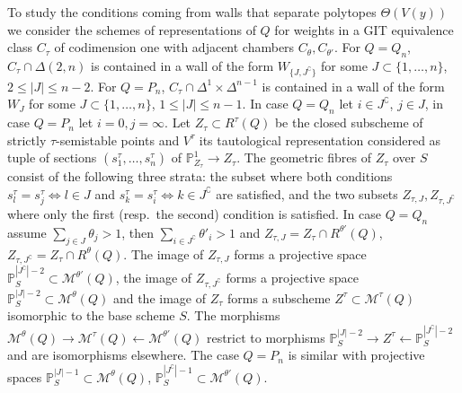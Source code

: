 \documentclass[ALCO,ThmDefs,Unicode,epreuves]{cedram}
\def\P{\mathds P}
\begin{document}
To study the conditions coming from walls that separate polytopes $\Theta(V(y))$ 
we consider the schemes of representations of $Q$ for weights in a GIT equivalence
class $C_\tau$ of codimension one with adjacent chambers $C_\theta,C_{\theta'}$. 
For $Q=Q_n$, $C_\tau\cap\Delta(2,n)$ is contained in a wall of the form 
$W_{\{J,J^\complement\}}$ for some $J\subset\{1,\ldots,n\}$, $2\leq|J|\leq n-2$. 
For $Q=P_n$, $C_\tau\cap\Delta^1\times\Delta^{n-1}$ is contained in a 
wall of the form $W_J$ for some $J\subset\{1,\ldots,n\}$, $1\leq|J|\leq n-1$. 
In case $Q=Q_n$ let $i\in J^\complement$, $j\in J$, in case $Q=P_n$ let $i=0,j=\infty$.
Let $Z_\tau\subset R^\tau(Q)$ be the closed subscheme of strictly 
$\tau$-semistable points and $V^\tau$ its tautological representation
considered as tuple of sections $(s^\tau_1,\ldots,s^\tau_n)$ of $\P^1_{Z_\tau}\to Z_\tau$.
The geometric fibres of $Z_\tau$ over $S$ consist of the following three strata: 
the subset where both conditions $s^\tau_l=s^\tau_j\Leftrightarrow l\in J$ and 
$s^\tau_k=s^\tau_i\Leftrightarrow k\in J^\complement$ 
are satisfied, and the two subsets $Z_{\tau,J},Z_{\tau,J^\complement}$ where only 
the first (resp.\ the second) condition is satisfied. 
In case $Q=Q_n$ assume $\sum_{j\in J}\theta_j>1$, then 
$\sum_{i\in J^\complement}\theta'_i>1$ and $Z_{\tau,J}=Z_{\tau}\cap R^{\theta'}(Q)$, 
$Z_{\tau,J^\complement}=Z_{\tau}\cap R^\theta(Q)$.
The image of $Z_{\tau,J}$ forms a projective space 
$\P^{|J^\complement|-2}_S\subset\mathcal M^{\theta'}(Q)$, the image of 
$Z_{\tau,J^\complement}$ forms a projective space 
$\P^{|J|-2}_S\subset\mathcal M^\theta(Q)$ and the image of $Z_\tau$ forms 
a subscheme $Z^\tau\subset\mathcal M^\tau(Q)$ isomorphic to the base scheme $S$. 
The morphisms
$\mathcal M^\theta(Q)\rightarrow\mathcal M^\tau(Q)\leftarrow\mathcal M^{\theta'}(Q)$
restrict to morphisms $\P^{|J|-2}_S\rightarrow Z^\tau\leftarrow\P^{|J^\complement|-2}_S$
and are isomorphisms elsewhere.
The case $Q=P_n$ is similar with projective spaces
$\P^{|J|-1}_S\subset\mathcal M^\theta(Q)$, 
$\P^{|J^\complement|-1}_S\subset\mathcal M^{\theta'}(Q)$. 

\end{document}
